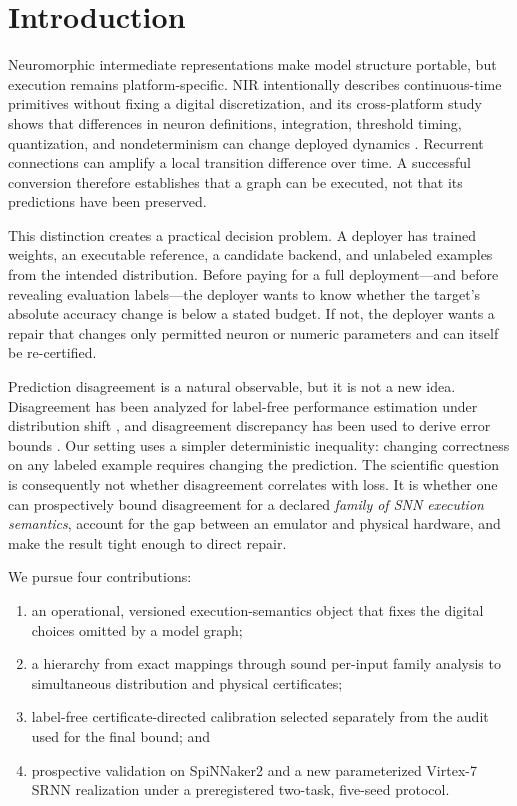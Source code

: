 \section{Introduction}

Neuromorphic intermediate representations make model structure portable, but
execution remains platform-specific. NIR intentionally describes continuous-time
primitives without fixing a digital discretization, and its cross-platform study
shows that differences in neuron definitions, integration, threshold timing,
quantization, and nondeterminism can change deployed dynamics
\citep{pedersen2024nir}. Recurrent connections can amplify a local transition
difference over time. A successful conversion therefore establishes that a graph
can be executed, not that its predictions have been preserved.

This distinction creates a practical decision problem. A deployer has trained
weights, an executable reference, a candidate backend, and unlabeled examples
from the intended distribution. Before paying for a full deployment---and before
revealing evaluation labels---the deployer wants to know whether the target's
absolute accuracy change is below a stated budget. If not, the deployer wants a
repair that changes only permitted neuron or numeric parameters and can itself be
re-certified.

Prediction disagreement is a natural observable, but it is not a new idea.
Disagreement has been analyzed for label-free performance estimation under
distribution shift \citep{lee2023dotl}, and disagreement discrepancy has been used
to derive error bounds \citep{rosenfeld2023disagreement}. Our setting uses a
simpler deterministic inequality: changing correctness on any labeled example
requires changing the prediction. The scientific question is consequently not
whether disagreement correlates with loss. It is whether one can prospectively
bound disagreement for a declared \emph{family of SNN execution semantics},
account for the gap between an emulator and physical hardware, and make the
result tight enough to direct repair.

We pursue four contributions:
\begin{enumerate}
    \item an operational, versioned execution-semantics object that fixes the
    digital choices omitted by a model graph;
    \item a hierarchy from exact mappings through sound per-input family analysis
    to simultaneous distribution and physical certificates;
    \item label-free certificate-directed calibration selected separately from
    the audit used for the final bound; and
    \item prospective validation on SpiNNaker2 and a new parameterized Virtex-7
    SRNN realization under a preregistered two-task, five-seed protocol.
\end{enumerate}

